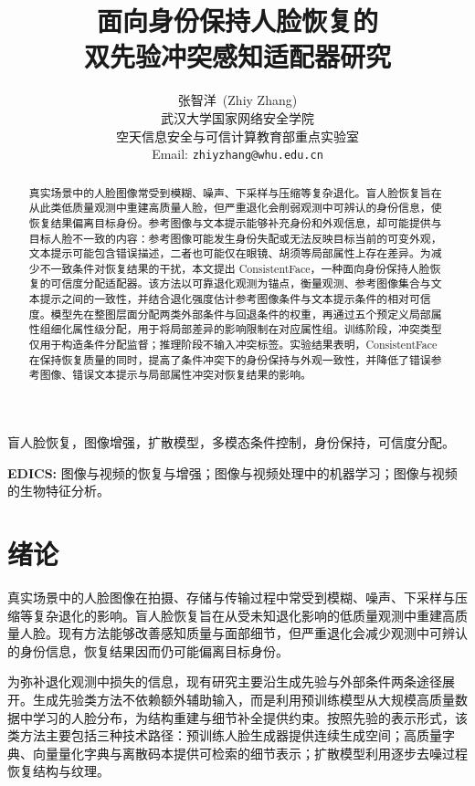 \documentclass[journal]{IEEEtran}
\title{面向身份保持人脸恢复的\\双先验冲突感知适配器研究}
\author{张智洋~(Zhiy Zhang)\\
武汉大学国家网络安全学院\\
空天信息安全与可信计算教育部重点实验室\\
Email: \texttt{zhiyzhang@whu.edu.cn}}
\begin{document}
\maketitle

\begin{abstract}
真实场景中的人脸图像常受到模糊、噪声、下采样与压缩等复杂退化。盲人脸恢复旨在从此类低质量观测中重建高质量人脸，但严重退化会削弱观测中可辨认的身份信息，使恢复结果偏离目标身份。参考图像与文本提示能够补充身份和外观信息，却可能提供与目标人脸不一致的内容：参考图像可能发生身份失配或无法反映目标当前的可变外观，文本提示可能包含错误描述，二者也可能仅在眼镜、胡须等局部属性上存在差异。为减少不一致条件对恢复结果的干扰，本文提出 ConsistentFace，一种面向身份保持人脸恢复的可信度分配适配器。该方法以可靠退化观测为锚点，衡量观测、参考图像集合与文本提示之间的一致性，并结合退化强度估计参考图像条件与文本提示条件的相对可信度。模型先在整图层面分配两类外部条件与回退条件的权重，再通过五个预定义局部属性组细化属性级分配，用于将局部差异的影响限制在对应属性组。训练阶段，冲突类型仅用于构造条件分配监督；推理阶段不输入冲突标签。实验结果表明，ConsistentFace 在保持恢复质量的同时，提高了条件冲突下的身份保持与外观一致性，并降低了错误参考图像、错误文本提示与局部属性冲突对恢复结果的影响。
\end{abstract}

\begin{IEEEkeywords}
盲人脸恢复，图像增强，扩散模型，多模态条件控制，身份保持，可信度分配。
\end{IEEEkeywords}

\noindent\textbf{EDICS:} 图像与视频的恢复与增强；图像与视频处理中的机器学习；图像与视频的生物特征分析。

\section{绪论}
\label{sec:main_intro}

真实场景中的人脸图像在拍摄、存储与传输过程中常受到模糊、噪声、下采样与压缩等复杂退化的影响\cite{wang2021gfpgan,wang2023dr2}。盲人脸恢复旨在从受未知退化影响的低质量观测中重建高质量人脸\cite{wang2021gfpgan,wang2022restoreformer}。现有方法能够改善感知质量与面部细节，但严重退化会减少观测中可辨认的身份信息，恢复结果因而仍可能偏离目标身份\cite{suin2024diffuse,liu2025faceme,niu2026iconface}。

为弥补退化观测中损失的信息，现有研究主要沿生成先验与外部条件两条途径展开。生成先验类方法不依赖额外辅助输入，而是利用预训练模型从大规模高质量数据中学习的人脸分布，为结构重建与细节补全提供约束。按照先验的表示形式，该类方法主要包括三种技术路径：预训练人脸生成器提供连续生成空间\cite{wang2021gfpgan}；高质量字典、向量量化字典与离散码本提供可检索的细节表示\cite{wang2022restoreformer,gu2022vqfr,zhou2022codeformer}；扩散模型利用逐步去噪过程恢复结构与纹理\cite{wang2023dr2,yue2022difface,lin2024diffbir}。
\end{document}
